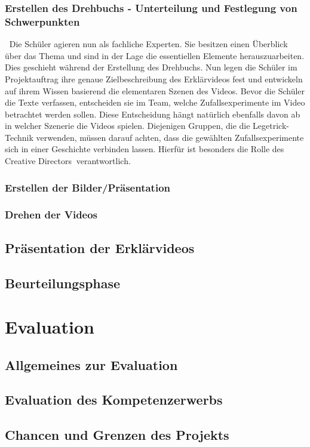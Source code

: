 \documentclass[a4paper,12pt,twoside=false]{scrartcl}
\begin{document}
\subsubsection{Erstellen des Drehbuchs - Unterteilung und Festlegung von Schwerpunkten}$~$\newline
Die Schüler agieren nun als fachliche Experten. Sie besitzen einen Überblick über das Thema und sind in der Lage die essentiellen Elemente herauszuarbeiten. Dies geschieht während der Erstellung des Drehbuchs. Nun legen die Schüler im Projektauftrag ihre genaue Zielbeschreibung des Erklärvideos fest und entwickeln auf ihrem Wissen basierend die elementaren Szenen des Videos. Bevor die Schüler die Texte verfassen, entscheiden sie im Team, welche Zufallsexperimente im Video betrachtet werden sollen. Diese Entscheidung hängt natürlich ebenfalls davon ab in welcher Szenerie die Videos spielen. Diejenigen Gruppen, die die Legetrick-Technik verwenden, müssen darauf achten, dass die gewählten Zufallsexperimente sich in einer Geschichte verbinden lassen. Hierfür ist besonders die Rolle des \glqq Creative Directors\grqq$~$ verantwortlich. 
\subsubsection{Erstellen der Bilder/Präsentation}
\subsubsection{Drehen der Videos}
\subsection{Präsentation der Erklärvideos}
\subsection{Beurteilungsphase}
\section{Evaluation}
\subsection{Allgemeines zur Evaluation}
\subsection{Evaluation des Kompetenzerwerbs}
\subsection{Chancen und Grenzen des Projekts}
\end{document}
